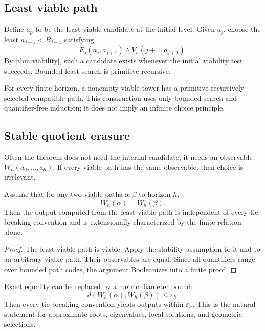 \subsection{Least viable path}

Define \(a_p\) to be the least viable candidate at the initial level.  Given
\(a_j\), choose the least \(a_{j+1}<B_{j+1}\) satisfying
\[
 E_j(a_j,a_{j+1})\wedge V_h(j+1,a_{j+1}).
\]
By \cref{thm:viability}, such a candidate exists whenever the initial
viability test succeeds.  Bounded least search is primitive recursive.

\begin{corollary}
For every finite horizon, a nonempty viable tower has a primitive-recursively
selected compatible path.  This construction uses only bounded search and
quantifier-free induction; it does not imply an infinite choice principle.
\end{corollary}

\subsection{Stable quotient erasure}

Often the theorem does not need the internal candidate; it needs an observable
\(W_h(a_0,\ldots,a_h)\).  If every viable path has the same observable, then
choice is irrelevant.

\begin{theorem}
Assume that for any two viable paths \(\alpha,\beta\) to horizon \(h\),
\[
       W_h(\alpha)=W_h(\beta).
\]
Then the output computed from the least viable path is independent of every
tie-breaking convention and is extensionally characterized by the finite
relation alone.
\end{theorem}

\begin{proof}
The least viable path is viable.  Apply the stability assumption to it and to
an arbitrary viable path.  Their observables are equal.  Since all quantifiers
range over bounded path codes, the argument Booleanizes into a finite proof.
\end{proof}

Exact equality can be replaced by a metric diameter bound:
\[
 d(W_h(\alpha),W_h(\beta))\le\varepsilon_h.
\]
Then every tie-breaking convention yields outputs within \(\varepsilon_h\).
This is the natural statement for approximate roots, eigenvalues, local
solutions, and geometric selections.

